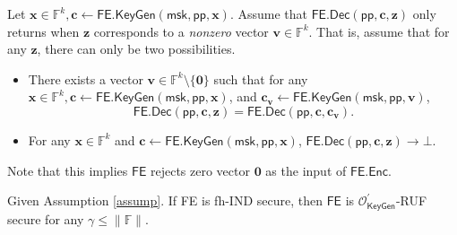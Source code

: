 \begin{assumption}
\label{assump}
Let $\mathbf{x} \in \mathbb{F}^k, \mathbf{c} \gets \textsf{FE.KeyGen}(\textsf{msk}, \textsf{pp}, \mathbf{x})$. Assume that $\textsf{FE.Dec}(\textsf{pp}, \mathbf{c}, \mathbf{z})$ only returns when $\mathbf{z}$ corresponds to a \emph{nonzero} vector $\mathbf{v} \in \mathbb{F}^k$. That is, assume that for any $\mathbf{z}$, there can only be two possibilities.

\begin{itemize}
	\item There exists a vector $\mathbf{v} \in \mathbb{F}^k \setminus \{\mathbf{0}\}$ such that for any $\mathbf{x} \in \mathbb{F}^k, \mathbf{c} \gets \textsf{FE.KeyGen}(\textsf{msk}, \textsf{pp}, \mathbf{x})$, and $\mathbf{c_v} \gets \textsf{FE.KeyGen}(\textsf{msk}, \textsf{pp}, \mathbf{v})$, 
	\[
		\textsf{FE.Dec}(\textsf{pp}, \mathbf{c}, \mathbf{z}) = \textsf{FE.Dec}(\textsf{pp}, \mathbf{c}, \mathbf{c_v}).
	\]
	\item For any $\mathbf{x} \in \mathbb{F}^k$ and $ \mathbf{c} \gets \textsf{FE.KeyGen}(\textsf{msk}, \textsf{pp}, \mathbf{x})$, $\textsf{FE.Dec}(\textsf{pp}, \mathbf{c}, \mathbf{z}) \to \bot$.

\end{itemize}
Note that this implies $\textsf{FE}$ rejects zero vector $\mathbf{0}$ as the input of $\textsf{FE.Enc}$.
\end{assumption}


\begin{theorem}
\label{thm:fh-IPFE:ind-ruf}
Given Assumption \ref{assump}. If \textsf{FE} is fh-IND secure, then $\textsf{FE}$ is $\mathcal{O}^\prime_{\textsf{KeyGen}}$-RUF secure for any $\gamma \leq \|\mathbb{F}\|$.

\end{theorem}

